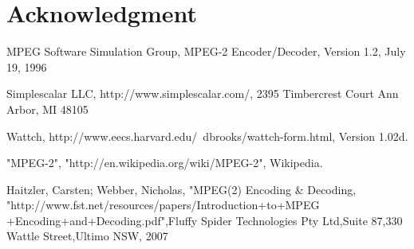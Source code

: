 \documentclass[journal]{IEEEtran}
\begin{document}
\section*{Acknowledgment}

\begin{thebibliography}{1}
MPEG Software Simulation Group, MPEG-2 Encoder/Decoder, Version 1.2, July 19, 1996

Simplescalar LLC, http://www.simplescalar.com/, 2395 Timbercrest Court Ann Arbor, MI 48105

Wattch, http://www.eecs.harvard.edu/~dbrooks/wattch-form.html, Version 1.02d.

"MPEG-2", "http://en.wikipedia.org/wiki/MPEG-2", Wikipedia.

Haitzler, Carsten; Webber, Nicholas, "MPEG(2) Encoding \& Decoding, "http://www.fst.net/resources/papers/Introduction+to+MPEG
+Encoding+and+Decoding.pdf",Fluffy Spider Technologies Pty Ltd,Suite 87,330 Wattle Street,Ultimo NSW, 2007

\end{thebibliography}
\end{document}
